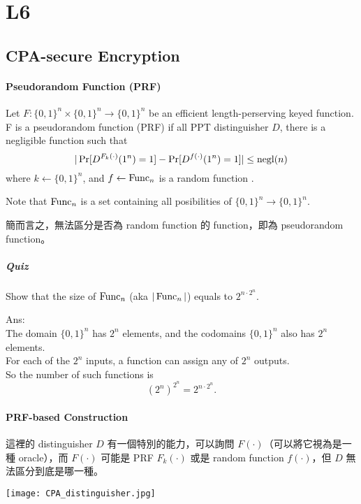 \section{L6}


\subsection{CPA-secure Encryption}


\paragraph{Pseudorandom Function (PRF)}  \label{PRF}

Let \(F: \{0, 1\}^n \times \{0, 1\}^n \rightarrow \{0, 1\}^n\) be an efficient length-perserving keyed function. \\
F is a pseudorandom function (PRF) if all PPT distinguisher \(D\), there is a negligible function such that
\[
	| \Pr[D^{F_k(\cdot)}(1^n) = 1] - \Pr[D^{f(\cdot)}(1^n) = 1] | \leq \operatorname{negl}(n)
\]
where \(k \leftarrow \{0,1\}^n\), and \(f \leftarrow \operatorname{\mathrm{Func}}_n\) is a random function .

Note that \(\operatorname{\mathrm{Func}}_n\) is a set containing all posibilities of \(\{0, 1\}^n \rightarrow \{0, 1\}^n\).

簡而言之，無法區分是否為 random function 的 function，即為 pseudorandom function。

\subparagraph{Quiz}

Show that the size of \(\operatorname{\mathrm{Func}}_n\) (aka \(|\operatorname{\mathrm{Func}}_n|\)) equals to \(2^{n \cdot 2^n}\).

Ans: \\
The domain \(\{0, 1\}^n\) has \(2^n\) elements, and the codomains \(\{0, 1\}^n\) also has \(2^n\) elements. \\
For each of the \(2^n\) inputs, a function can assign any of \(2^n\) outputs. \\
So the number of such functions is
\[(2^n)^{2^n} = 2^{n \cdot 2^n}.\]


\paragraph{PRF-based Construction}

這裡的 distinguisher \(D\) 有一個特別的能力，可以詢問 \(F(\cdot)\)（可以將它視為是一種 oracle），而 \(F(\cdot)\) 可能是 PRF \(F_k(\cdot)\) 或是 random function \(f(\cdot)\)，但 \(D\) 無法區分到底是哪一種。

\begin{center}
	\texttt{[image: CPA\_distinguisher.jpg]}
\end{center}

